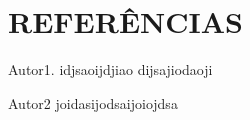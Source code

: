 \section*{REFERÊNCIAS}
\singlespacing
\setlength{\parindent}{0em}
Autor1. idjsaoijdjiao dijsajiodaoji

\bigskip

Autor2 joidasijodsaijoiojdsa